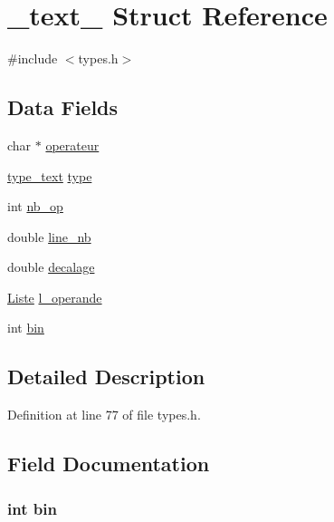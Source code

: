 \hypertarget{struct__text__}{\section{\-\_\-text\-\_\- Struct Reference}
\label{struct__text__}
}


{\ttfamily \#include $<$types.\-h$>$}

\subsection*{Data Fields}
\begin{DoxyCompactItemize}
\item 
char $\ast$ \hyperlink{struct__text___adc2a267b945f31e8e0dad4b528128cab}{operateur}
\item 
\hyperlink{types_8h_a964e2c8dafb8a61ce88c06a5dff4a404}{type\-\_\-text} \hyperlink{struct__text___a92c69ddff0b8be636cead81c5b73f667}{type}
\item 
int \hyperlink{struct__text___a88a29c0db6a919d126d1c94d573dd711}{nb\-\_\-op}
\item 
double \hyperlink{struct__text___a808a37180ef5a21555b2f0f68cf73cb6}{line\-\_\-nb}
\item 
double \hyperlink{struct__text___aac945295366b3dadfd1ec0da01eb6cb8}{decalage}
\item 
\hyperlink{liste_8h_a5268448ae2a031c105e053d5ea682580}{Liste} \hyperlink{struct__text___acdac487d99d10dba873a0f07707b220f}{l\-\_\-operande}
\item 
int \hyperlink{struct__text___ab0404d6ad833babfe91bc90aba14f769}{bin}
\end{DoxyCompactItemize}


\subsection{Detailed Description}


Definition at line 77 of file types.\-h.



\subsection{Field Documentation}
\hypertarget{struct__text___ab0404d6ad833babfe91bc90aba14f769}{
\subsubsection[{bin}]{\setlength{\rightskip}{0pt plus 5cm}int bin}}\label{struct__text___ab0404d6ad833babfe91bc90aba14f769}


